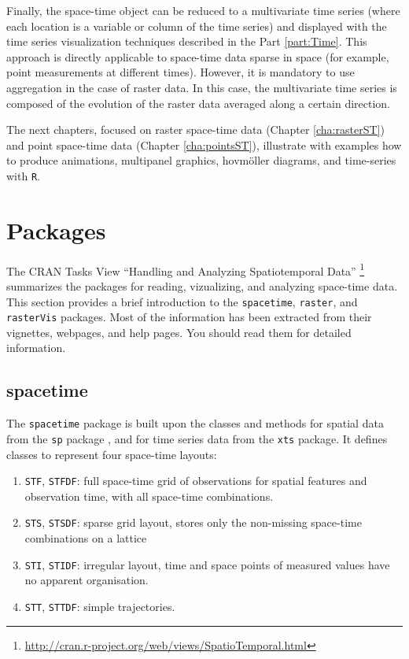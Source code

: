\documentclass[smallroyalvopaper]{memoir}
\begin{document}
Finally, the space-time object can be reduced to a multivariate time series (where each location is a variable or column of the time series) and displayed with the time series visualization techniques described in the Part \ref{part:Time}. This approach is directly applicable to space-time data sparse in space (for example, point measurements at different times). However, it is mandatory to use aggregation in the case of raster data. In this case, the multivariate time series is composed of the evolution of the raster data averaged along a certain direction.

The next chapters, focused on raster space-time data (Chapter \ref{cha:rasterST}) and point space-time data (Chapter \ref{cha:pointsST}), illustrate with examples how to produce animations, multipanel graphics, hovmöller diagrams, and time-series with \texttt{R}.

\section{Packages}
\label{sec:orgheadline41}
\label{sec:spacetime-packages}

The CRAN Tasks View ``Handling and Analyzing Spatiotemporal Data'' \footnote{\url{http://cran.r-project.org/web/views/SpatioTemporal.html}} summarizes the packages for reading, vizualizing, and analyzing space-time data. This section provides a brief introduction to the \texttt{spacetime}, \texttt{raster}, and \texttt{rasterVis} packages. Most of the information has been extracted from their vignettes, webpages, and help pages. You should read them for detailed information.

\subsection{spacetime}
\label{sec:orgheadline38}
\label{sec:spacetime}

The \texttt{spacetime} package \cite{Pebesma2012} is built upon the classes and methods for spatial data from the \texttt{sp} package , and for time series data from the \texttt{xts} package. It defines classes to represent four space-time layouts:

\begin{enumerate}
\item \texttt{STF}, \texttt{STFDF}: full space-time grid of observations for spatial features and observation time, with all space-time combinations.

\item \texttt{STS}, \texttt{STSDF}: sparse grid layout, stores only the non-missing space-time combinations on a lattice

\item \texttt{STI}, \texttt{STIDF}: irregular layout, time and space points of measured values have no apparent organisation.

\item \texttt{STT}, \texttt{STTDF}: simple trajectories.
\end{enumerate}
\end{document}
